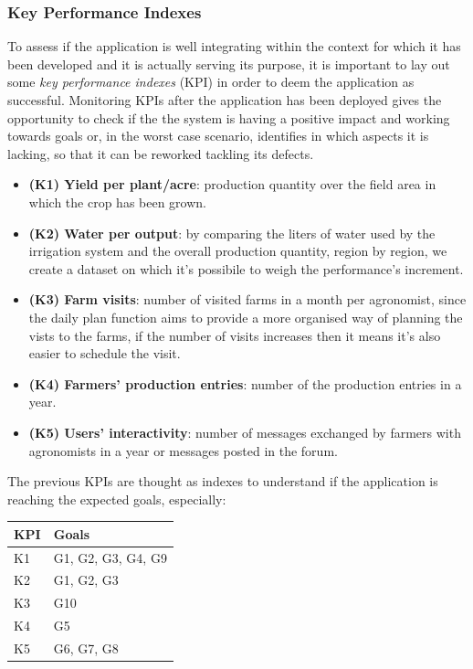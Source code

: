 \documentclass[table, 12pt]{article}
\begin{document}
\subsubsection{Key Performance Indexes}
To assess if the application is well integrating within the context for which it has been developed and it is actually serving its purpose, it is important to lay out some \textit{key performance indexes} (KPI) in order to deem the application as successful. Monitoring KPIs after the application has been deployed gives the opportunity to check if the the system is having a positive impact and working towards goals or, in the worst case scenario, identifies in which aspects it is lacking, so that it can be reworked tackling its defects.
\begin{itemize}  
    \item \textbf{(K1) Yield per plant/acre}: production quantity over the field area in which the crop has been grown.
    \item \textbf{(K2) Water per output}: by comparing the liters of water used by the irrigation system and the overall production quantity, region by region, we create a dataset on which it's possibile to weigh the performance's increment.
    \item \textbf{(K3) Farm visits}: number of visited farms in a month per agronomist, since the daily plan function aims to provide a more organised way of planning the vists to the farms, if the number of visits increases then it means it's also easier to schedule the visit.
    \item \textbf{(K4) Farmers' production entries}: number of the production entries in a year.
    \item \textbf{(K5) Users' interactivity}: number of messages exchanged by farmers with agronomists in a year or messages posted in the forum.
\end{itemize}

The previous KPIs are thought as indexes to understand if the application is reaching the expected goals, especially:

\begin{table}[H]
    \centering
    \begin{tabular}{|l|l|}
        \hline
        \textbf{KPI} & \textbf{Goals}\\\hline
        K1 & G1, G2, G3, G4, G9\\\hline
        K2 & G1, G2, G3  \\\hline
        K3 & G10\\\hline   
        K4 & G5 \\\hline
        K5 & G6, G7, G8\\\hline
    \end{tabular}
\end{table}
\end{document}
